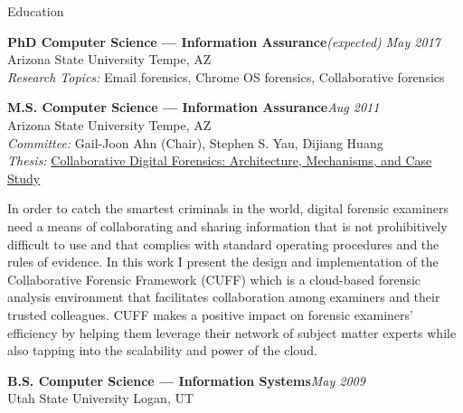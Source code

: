 
\begin{rSection}{Education}

\textbf{PhD Computer Science --- Information Assurance}\hfill \emph{(expected) May 2017}\\
Arizona State University \hfill {Tempe, AZ}\\
\textit{Research Topics:} Email forensics, Chrome OS forensics, Collaborative forensics

\textbf{M.S. Computer Science --- Information Assurance}\hfill \emph{Aug 2011}\\
Arizona State University \hfill {Tempe, AZ}\\
\textit{Committee:} Gail-Joon Ahn (Chair), Stephen S. Yau, Dijiang Huang\\
\textit{Thesis:} \href{http://repository.asu.edu/attachments/56996/content/Mabey_asu_0010N_10959.pdf}{Collaborative Digital Forensics: Architecture, Mechanisms, and Case Study}\begin{CVonly}
\begin{rQuote}
  In order to catch the smartest criminals in the world, digital forensic examiners need a means of collaborating and sharing information that is not prohibitively difficult to use and that complies with standard operating procedures and the rules of evidence. In this work I present the design and implementation of the Collaborative Forensic Framework (CUFF) which is a cloud-based forensic analysis environment that facilitates collaboration among examiners and their trusted colleagues. CUFF makes a positive impact on forensic examiners' efficiency by helping them leverage their network of subject matter experts while also tapping into the scalability and power of the cloud.
\end{rQuote}\end{CVonly}

\textbf{B.S. Computer Science --- Information Systems}\hfill \emph{May 2009}\\
Utah State University \hfill {Logan, UT}

\end{rSection}
